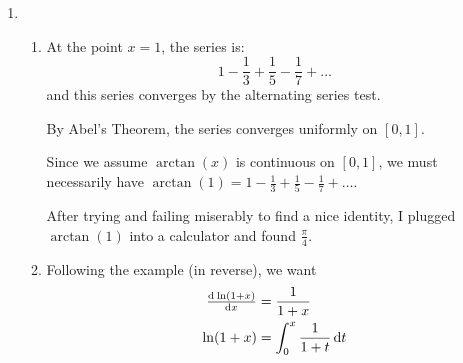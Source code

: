 \documentclass[12pt,letterpaper]{article}
\begin{document}
\begin{enumerate}
\begin{enumerate}
\begin{proof}
            So $a_0 = b_0$.

            Now, assuming $a_k = b_k$:

            \begin{align*}
              f^{(k + 1)}(0) &= \sum_{n = k + 1}^{\infty} \left(\prod_{m = 0}^{k} n - m\right) a_n 0^{n - (k + 1)} \\
              &= \left(\prod_{m = 0}^{k} (k + 1) - m \right) a_{k + 1} 0^0 + \left(\prod_{m = 0}^{k} (k + 2) - m \right) a_{k + 2} 0^1 + \dots \\
              &= \left(\prod_{m = 0}^{k} (k + 1) - m \right) a_{k + 1} \\
              &= \left(\prod_{m = 0}^{k} (k + 1) - m \right) b_{k + 1} \\
              &= \left(\prod_{m = 0}^{k} (k + 1) - m \right) b_{k + 1} 0^0 + \left(\prod_{m = 0}^{k} (k + 2) - m \right) b_{k + 2} 0^1 + \dots \\
              g^{(k + 1)}(0) &= \sum_{n = k + 1}^{\infty} \left(\prod_{m = 0}^{k} n - m\right) b_n 0^{n - (k + 1)} \\
            \end{align*}

            So we have shown by induction that $a_n = b_n, \forall n \in \{0, 1, 2, \dots\}$.
          \end{proof}
      \end{enumerate}
    \item
      \begin{enumerate}
        \item
          At the point $x = 1$, the series is:
          \[
            1 - \frac{1}{3} + \frac{1}{5} - \frac{1}{7} + \dots
          \]
          and this series converges by the alternating series test.

          By Abel's Theorem, the series converges uniformly on $[0, 1]$.

          Since we assume $\arctan(x)$ is continuous on $[0, 1]$,
          we must necessarily have $\arctan(1) = 1 - \frac{1}{3} + \frac{1}{5} - \frac{1}{7} + \dots$.

          After trying and failing miserably to find a nice identity, I plugged $\arctan(1)$ into a calculator and found $\frac{\pi}{4}$.
        \item
          Following the example (in reverse), we want
          \begin{align*}
            \od{\ln(1 + x)}{x} &= \frac{1}{1 + x}\\
            \ln(1 + x) &= \int_{0}^{x} \frac{1}{1 + t} \dif t\\
          \end{align*}


\end{enumerate}
\end{enumerate}
\end{document}

